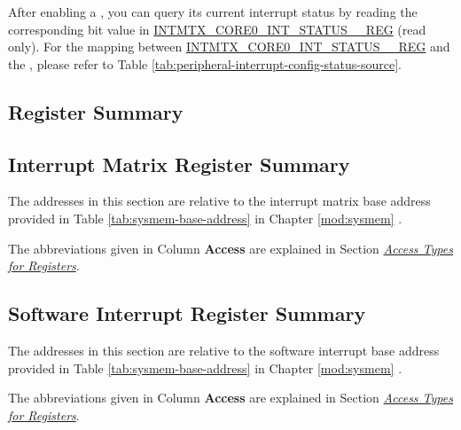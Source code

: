 \documentclass[main\_\_EN.tex]{subfiles}
\begin{document}
After enabling a , you can query its current interrupt status by reading the corresponding bit value in \hyperref[regdesc:INTMTXCORE0INTSTATUS0REG]{INTMTX\_CORE0\_INT\_STATUS\_\_REG} (read only). For the mapping between \hyperref[regdesc:INTMTXCORE0INTSTATUS0REG]{INTMTX\_CORE0\_INT\_STATUS\_\_REG} and the , please refer to Table \ref{tab:peripheral-interrupt-config-status-source}.













\newpage
\hypertarget{intmtrx-reg-summ}{}
\begin{landscape}
\section{Register Summary}


\subsection{Interrupt Matrix Register Summary}
\label{sec:intmtrx-reg-summ}

The addresses in this section are relative to the interrupt matrix base address provided in Table \ref{tab:sysmem-base-address} in Chapter \ref{mod:sysmem} \textit{}.

The abbreviations given in Column \textbf{Access} are explained in Section \hyperref[glossary-access-types]{\textit{Access Types for Registers}}.




\subsection{Software Interrupt Register Summary}
\label{sec:intpri-reg-summ}
The addresses in this section are relative to the software interrupt base address provided in Table \ref{tab:sysmem-base-address} in Chapter \ref{mod:sysmem} \textit{}.

The abbreviations given in Column \textbf{Access} are explained in Section \hyperref[glossary-access-types]{\textit{Access Types for Registers}}.



\end{landscape}
\end{document}
